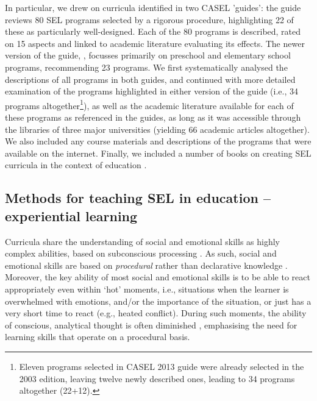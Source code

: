 \documentclass[prodmode,acmtochi]{acmsmall}
\newcommand{\GeraldineTODO}[1]{}
\begin{document}
In particular, we drew on curricula identified in two CASEL 'guides': the  guide reviews 80 SEL programs selected by a rigorous procedure, highlighting 22 of
 these as particularly well-designed. Each of the 80 programs is described, rated on 15 aspects and linked to academic literature evaluating its effects. The newer version of the guide, , focusses primarily on preschool and elementary school programs, recommending 23 programs.
%
We first systematically analysed the descriptions of all programs in both guides, and continued with more detailed examination of the programs highlighted in either version of the guide (i.e., 34 programs altogether\footnote{Eleven programs selected in CASEL 2013 guide were already selected in the 2003 edition, leaving twelve newly described ones, leading to 34 programs altogether (22+12). \GeraldineTODO{LIST\ THESE\ BY\ NAME\ HERE\ AS\ COMPLETE\ LIST?}}), as well as the academic literature available for each of these programs as referenced in the guides, as long as it was accessible through the libraries of three major universities (yielding 66 academic articles altogether). We also included any course materials and descriptions of the programs that were available on the internet. Finally, we included a number of books on creating SEL curricula in the context of education \cite{Maree2007,Elias1997,Pasi2001,Zins2004,Patrikakou2005}. 








\subsection{Methods for teaching SEL in education -- experiential learning}
\label{sec:methods}

Curricula share the understanding of social and emotional skills as highly complex abilities, based on subconscious processing \cite{Ambady2010,Lieberman2000}. As such, social and emotional skills are based on \emph{procedural} rather than declarative knowledge \cite[p.288]{kruglanski2007social}. Moreover, the key ability of most social and emotional skills is to be able to react appropriately even within `hot' moments, i.e., situations  when the learner is overwhelmed with emotions, and/or the importance of the situation, or just has a very short time to react (e.g., heated conflict). During such moments, the ability of conscious, analytical thought is often diminished \cite{Wyman2010,leDoux1998}, emphasising the need for learning skills that operate on a procedural basis.
\end{document}
